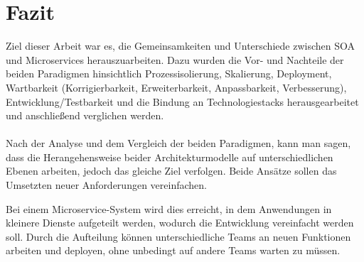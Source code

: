 \chapter{Fazit}
\label{chap:Fazit}
Ziel dieser Arbeit war es, die Gemeinsamkeiten und Unterschiede zwischen SOA und Microservices herauszuarbeiten. Dazu wurden die Vor- und Nachteile der beiden Paradigmen hinsichtlich Prozessisolierung, Skalierung, Deployment, Wartbarkeit (Korrigierbarkeit, Erweiterbarkeit, Anpassbarkeit, Verbesserung), Entwicklung/Testbarkeit und die Bindung an Technologiestacks herausgearbeitet und anschließend verglichen werden.
\\\\
Nach der Analyse und dem Vergleich der beiden Paradigmen, kann man sagen, dass die Herangehensweise beider Architekturmodelle auf unterschiedlichen Ebenen arbeiten, jedoch das gleiche Ziel verfolgen. Beide Ansätze sollen das Umsetzten neuer Anforderungen vereinfachen.

Bei einem Microservice-System wird dies erreicht, in dem Anwendungen in kleinere Dienste aufgeteilt werden, wodurch die Entwicklung vereinfacht werden soll. Durch die Aufteilung können unterschiedliche Teams an neuen Funktionen arbeiten und deployen, ohne unbedingt auf andere Teams warten zu müssen.

